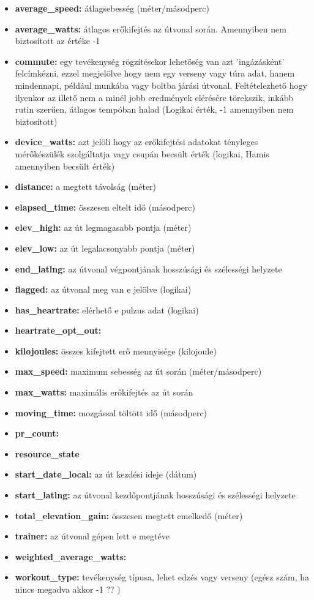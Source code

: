\begin{itemize}
	\item \textbf{average\_speed:} átlagsebesség (méter/másodperc)
	\item \textbf{average\_watts:} átlagos erőkifejtés az útvonal során. Amennyiben nem biztosított az értéke -1
	\item \textbf{commute:} egy tevékenység rögzítésekor lehetőség van azt 'ingázásként' felcímkézni, ezzel megjelölve hogy nem egy verseny vagy túra adat, hanem mindennapi, például munkába vagy boltba járási útvonal. Feltételezhető hogy ilyenkor az illető nem a minél jobb eredmények elérésére törekszik, inkább rutin szerűen, átlagos tempóban halad (Logikai érték, -1 amennyiben nem biztosított)
	\item \textbf{device\_watts:} azt jelöli hogy az erőkifejtési adatokat tényleges mérőkészülék szolgáltatja vagy csupán becsült érték (logikai, Hamis amennyiben becsült érték) 
	\item \textbf{distance:} a megtett távolság (méter)
	\item \textbf{elapsed\_time:} összesen eltelt idő (másodperc)
	\item \textbf{elev\_high:} az út legmagasabb pontja (méter)
	\item \textbf{elev\_low:} az út legalacsonyabb pontja (méter)
	\item \textbf{end\_latlng:} az útvonal végpontjának hosszúsági és szélességi helyzete
	\item \textbf{flagged:} az útvonal meg van e jelölve (logikai)
	\item \textbf{has\_heartrate:} elérhető e pulzus adat (logikai)
	\item \textbf{heartrate\_opt\_out:} 
	\item \textbf{kilojoules:} összes kifejtett erő mennyisége (kilojoule)
	\item \textbf{max\_speed:} maximum sebesség az út során (méter/másodperc)
	\item \textbf{max\_watts:} maximális erőkifejtés az út során
	\item \textbf{moving\_time:} mozgással töltött idő (másodperc)
	\item \textbf{pr\_count:}
	\item \textbf{resource\_state}
	\item \textbf{start\_date\_local:} az út kezdési ideje (dátum)
	\item \textbf{start\_latlng:} az útvonal kezdőpontjának hosszúsági és szélességi helyzete
	\item \textbf{total\_elevation\_gain:} összesen megtett emelkedő (méter)
	\item \textbf{trainer:} az útvonal gépen lett e megtéve
	\item \textbf{weighted\_average\_watts:}
	\item \textbf{workout\_type:} tevékenység típusa, lehet edzés vagy verseny (egész szám, ha nincs megadva akkor -1 ?? )
\end{itemize}










